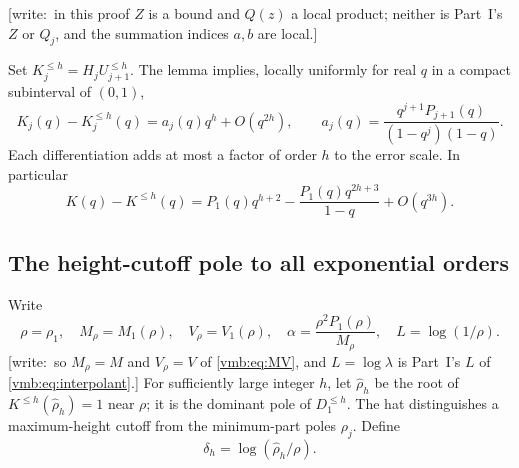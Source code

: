 \documentclass[11pt,a4paper]{article}
\numberwithin{equation}{section}
\theoremstyle{definition}\newtheorem{definition}[theorem]{Definition}
\theoremstyle{remark}\newtheorem{remark}[theorem]{Remark}
\newcommand{\wrt}[1]{\textup{[}\textsf{write:}~#1\textup{]}}
\begin{document}
\wrt{in this proof $Z$ is a bound and $Q(z)$ a local product; neither is
Part~I's $Z$ or $Q_j$, and the summation indices $a,b$ are local.}

Set $K_j^{\le h}=H_jU_{j+1}^{\le h}$. The lemma implies, locally uniformly
for real $q$ in a compact subinterval of $(0,1)$,
\begin{equation}\label{vmb:cw:eq:generaltail}
 K_j(q)-K_j^{\le h}(q)=a_j(q)q^h+O(q^{2h}),\qquad
 a_j(q)=\frac{q^{j+1}P_{j+1}(q)}{(1-q^j)(1-q)}.
\end{equation}
Each differentiation adds at most a factor of order $h$ to the error
scale. In particular
\begin{equation}\label{vmb:cw:eq:K1tail2}
 K(q)-K^{\le h}(q)
 =P_1(q)q^{h+2}
  -\frac{P_1(q)q^{2h+3}}{1-q}+O(q^{3h}).
\end{equation}

\subsection{The height-cutoff pole to all exponential orders}
Write
\begin{equation}\label{vmb:cw:eq:physicalconst}
 \rho=\rho_1,\quad M_\rho=M_1(\rho),\quad V_\rho=V_1(\rho),\quad
 \alpha=\frac{\rho^2P_1(\rho)}{M_\rho},\quad
 L=\log(1/\rho).
\end{equation}
\wrt{so $M_\rho=M$ and $V_\rho=V$ of \eqref{vmb:eq:MV}, and $L=\log\lambda$
is Part~I's $L$ of \eqref{vmb:eq:interpolant}.}
For sufficiently large integer $h$, let $\widehat\rho_h$ be the root of
$K^{\le h}(\widehat\rho_h)=1$ near $\rho$; it is the dominant pole of $D_1^{\le h}$.
The hat distinguishes a maximum-height cutoff from the minimum-part poles
$\rho_j$. Define
\[
 \delta_h=\log(\widehat\rho_h/\rho).
\]
\end{document}
